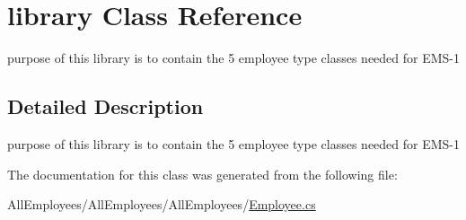 \hypertarget{classlibrary}{}\section{library Class Reference}
\label{classlibrary}


purpose of this library is to contain the 5 employee type classes needed for E\+M\+S-\/1  




\subsection{Detailed Description}
purpose of this library is to contain the 5 employee type classes needed for E\+M\+S-\/1 

The documentation for this class was generated from the following file\+:\begin{DoxyCompactItemize}
\item 
All\+Employees/\+All\+Employees/\+All\+Employees/\hyperlink{_employee_8cs}{Employee.\+cs}\end{DoxyCompactItemize}
